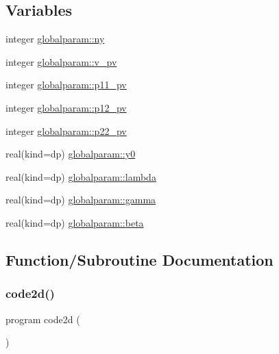 \subsection*{Variables}
\begin{DoxyCompactItemize}
\item 
integer \mbox{\hyperlink{namespaceglobalparam_ae3e17c94b4a693ce99dc99ca85e3aba5}{globalparam\+::ny}}
\item 
integer \mbox{\hyperlink{namespaceglobalparam_a980a183375fbe21d1ba02b3611dcc94d}{globalparam\+::v\+\_\+pv}}
\item 
integer \mbox{\hyperlink{namespaceglobalparam_a454092edac459f96bb9045ced3f632bd}{globalparam\+::p11\+\_\+pv}}
\item 
integer \mbox{\hyperlink{namespaceglobalparam_a9d0f6eb467ec66a6825d64e743f0fc36}{globalparam\+::p12\+\_\+pv}}
\item 
integer \mbox{\hyperlink{namespaceglobalparam_a1c0b88f532e0bb8c21c4aa92a92405ca}{globalparam\+::p22\+\_\+pv}}
\item 
real(kind=dp) \mbox{\hyperlink{namespaceglobalparam_a6192d97c147b8b0f5ebda79933dd6f16}{globalparam\+::y0}}
\item 
real(kind=dp) \mbox{\hyperlink{namespaceglobalparam_afcf85dea7c5d650ef77d480eb6d2a614}{globalparam\+::lambda}}
\item 
real(kind=dp) \mbox{\hyperlink{namespaceglobalparam_a22c2013f9cb1fb03d79e99fc038d55d1}{globalparam\+::gamma}}
\item 
real(kind=dp) \mbox{\hyperlink{namespaceglobalparam_a71ed33aead9f8bd6716557281b189e3c}{globalparam\+::beta}}
\end{DoxyCompactItemize}


\subsection{Function/\+Subroutine Documentation}
\mbox{\label{main2Dv1_01_07copy_08_8f90_a8712173bc20143ca5b1b8cbd782b563e}} 
\subsubsection{\texorpdfstring{code2d()}{code2d()}}
{\footnotesize\ttfamily program code2d (\begin{DoxyParamCaption}{ }\end{DoxyParamCaption})}

